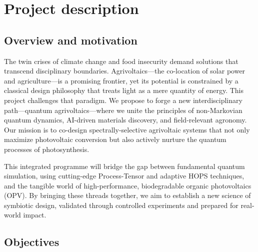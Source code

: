 \documentclass[11pt,a4paper]{article}
\begin{document}
\section*{Project description}
\subsection*{Overview and motivation}

The twin crises of climate change and food insecurity demand solutions that transcend disciplinary boundaries. Agrivoltaics—the co-location of solar power and agriculture—is a promising frontier, yet its potential is constrained by a classical design philosophy that treats light as a mere quantity of energy. This project challenges that paradigm. We propose to forge a new interdisciplinary path—quantum agrivoltaics—where we unite the principles of non-Markovian quantum dynamics, AI-driven materials discovery, and field-relevant agronomy. Our mission is to co-design spectrally-selective agrivoltaic systems that not only maximize photovoltaic conversion but also actively nurture the quantum processes of photosynthesis.

This integrated programme will bridge the gap between fundamental quantum simulation, using cutting-edge Process-Tensor and adaptive HOPS techniques, and the tangible world of high-performance, biodegradable organic photovoltaics (OPV). By bringing these threads together, we aim to establish a new science of symbiotic design, validated through controlled experiments and prepared for real-world impact.

\subsection*{Objectives}
\end{document}
